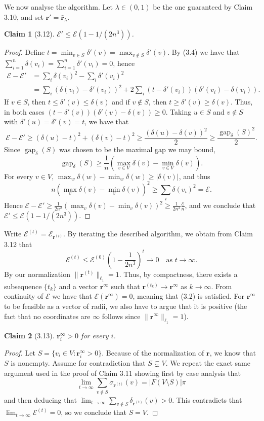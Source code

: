 \documentclass[UTF8,11pt]{ctexart}
\newtheorem*{claim}{Claim}
\theoremstyle{definition}
\begin{document}
We now analyse the algorithm. Let $\lambda\in(0,1)$ be the one guaranteed by Claim 3.10, and set $\mathbf r'=\bar{\mathbf r}_\lambda$.
\begin{claim}[3.12]
$\mathcal E'\le\mathcal E(1-1/(2n^3))$.
\end{claim}
\begin{proof}
Define $t=\min_{v\in S}\delta'(v)=\max_{v\notin S}\delta'(v)$. By (3.4) we have that $\sum_{i=1}^n\delta(v_i)=\sum_{i=1}^n\delta'(v_i)=0$, hence
\begin{align*}
\mathcal E-\mathcal E'
&=\sum_i\delta(v_i)^2-\sum_i\delta'(v_i)^2\\
&=\sum_i(\delta(v_i)-\delta'(v_i))^2
+2\sum_i(t-\delta'(v_i))(\delta'(v_i)-\delta(v_i)).
\end{align*}
If $v\in S$, then $t\le\delta'(v)\le\delta(v)$ and if $v\notin S$, then $t\ge\delta'(v)\ge\delta(v)$. Thus, in both cases $(t-\delta'(v))(\delta'(v)-\delta(v))\ge0$. Taking $u\in S$ and $v\notin S$ with $\delta'(u)=\delta'(v)=t$, we have that
\[
\mathcal E-\mathcal E'\ge(\delta(u)-t)^2+(\delta(v)-t)^2
\ge\frac{(\delta(u)-\delta(v))^2}{2}\ge\frac{\operatorname{gap}_\delta(S)^2}{2}.
\]
Since $\operatorname{gap}_\delta(S)$ was chosen to be the maximal gap we may bound,
\[
\operatorname{gap}_\delta(S)\ge\frac1n\left(\max_{v\in V}\delta(v)-\min_{v\in V}\delta(v)\right).
\]
For every $v\in V$, $\max_w\delta(w)-\min_w\delta(w)\ge|\delta(v)|$, and thus
\[
n\left(\max_v\delta(v)-\min_v\delta(v)\right)^2\ge\sum_i\delta(v_i)^2=\mathcal E.
\]
Hence $\mathcal E-\mathcal E'\ge\frac1{2n^2}(\max_v\delta(v)-\min_v\delta(v))^2\ge\frac1{2n^2}\frac{\mathcal E}{n}$, and we conclude that $\mathcal E'\le\mathcal E(1-1/(2n^3))$.
\end{proof}
Write $\mathcal E^{(t)}=\mathcal E_{\mathbf r^{(t)}}$. By iterating the described algorithm, we obtain from Claim 3.12 that
\[
\mathcal E^{(t)}\le\mathcal E^{(0)}\left(1-\frac1{2n^3}\right)^t\longrightarrow0\quad\text{as }t\to\infty.
\]
By our normalization $\|\mathbf r^{(t)}\|_{\ell_1}=1$. Thus, by compactness, there exists a subsequence $\{t_k\}$ and a vector $\mathbf r^\infty$ such that $\mathbf r^{(t_k)}\to\mathbf r^\infty$ as $k\to\infty$. From continuity of $\mathcal E$ we have that $\mathcal E(\mathbf r^\infty)=0$, meaning that (3.2) is satisfied. For $\mathbf r^\infty$ to be feasible as a vector of radii, we also have to argue that it is positive (the fact that no coordinates are $\infty$ follows since $\|\mathbf r^\infty\|_{\ell_1}=1$).
\begin{claim}[3.13]
$\mathbf r_i^\infty>0$ for every $i$.
\end{claim}
\begin{proof}
Let $S=\{v_i\in V:\mathbf r_i^\infty>0\}$. Because of the normalization of $\mathbf r$, we know that $S$ is nonempty. Assume for contradiction that $S\subsetneq V$. We repeat the exact same argument used in the proof of Claim 3.11 showing first by case analysis that
\[
\lim_{t\to\infty}\sum_{v\notin S}\sigma_{\mathbf r^{(t)}}(v)=|F(V\setminus S)|\pi
\]
and then deducing that $\lim_{t\to\infty}\sum_{v\notin S}\delta_{\mathbf r^{(t)}}(v)>0$.
This contradicts that $\lim_{t\to\infty}\mathcal E^{(t)}=0$, so we conclude that $S=V$.
\end{proof}
\end{document}
